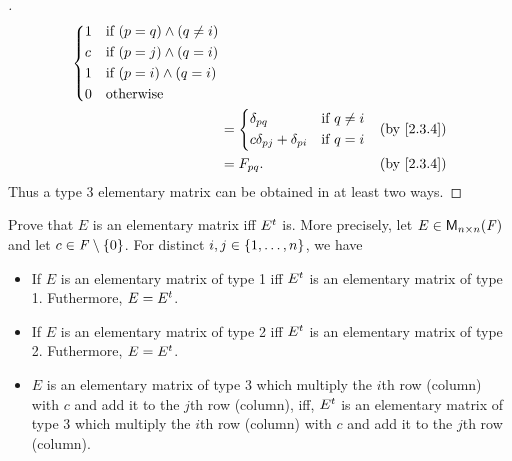 \begin{proof}[]
\begin{align*}
\begin{dcases}
                                                      1 & \text{if } (p = q) \land (q \neq i) \\
                                                      c & \text{if } (p = j) \land (q = i)    \\
                                                      1 & \text{if } (p = i) \land (q = i)    \\
                                                      0 & \text{otherwise}
                                                    \end{dcases}                                            \\
                                                & = \begin{dcases}
                                                      \delta_{p q}                  & \text{if } q \neq i \\
                                                      c \delta_{p j} + \delta_{p i} & \text{if } q = i
                                                    \end{dcases} &  & \text{(by \cref{2.3.4})}                                \\
                                                & = F_{p q}.                                             &  & \text{(by \cref{2.3.4})}
  \end{align*}
  Thus a type 3 elementary matrix can be obtained in at least two ways.
\end{proof}

\begin{ex}\label{ex:3.1.5}
  Prove that \(E\) is an elementary matrix iff \({E}^{t}\) is.
  More precisely, let \(E \in \mathsf{M}_{{n} \times n}({\mathit{F}})\) and let \(c \in \mathit{F} \setminus \left\lbrace0\right\rbrace\).
  For distinct \(i, j \in \left\lbrace1, \dots, n\right\rbrace\), we have
  \begin{itemize}
    \item If \(E\) is an elementary matrix of type 1 iff \({E}^{t}\) is an elementary matrix of type 1.
          Futhermore, \(E = {E}^{t}\).
    \item If \(E\) is an elementary matrix of type 2 iff \({E}^{t}\) is an elementary matrix of type 2.
          Futhermore, \(E = {E}^{t}\).
    \item \(E\) is an elementary matrix of type 3 which multiply the \(i\)th row (column) with \(c\) and add it to the \(j\)th row (column), iff, \({E}^{t}\) is an elementary matrix of type 3 which multiply the \(i\)th row (column) with \(c\) and add it to the \(j\)th row (column).
  \end{itemize}
\end{ex}

